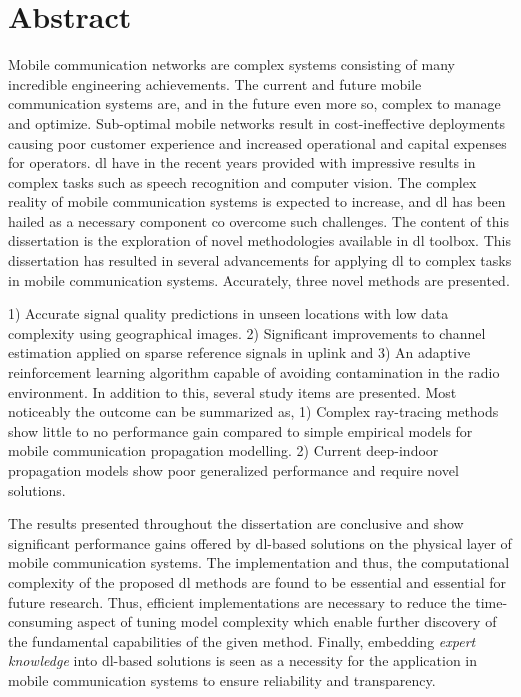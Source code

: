 \chapter*{Abstract}
Mobile communication networks are complex systems consisting of many incredible engineering achievements. The current and future mobile communication systems are, and in the future even more so, complex to manage and optimize. Sub-optimal mobile networks result in cost-ineffective deployments causing poor customer experience and increased operational and capital expenses for operators. \acrfull{dl} have in the recent years provided with impressive results in complex tasks such as speech recognition and computer vision. The complex reality of mobile communication systems is expected to increase, and \acrlong{dl} has been hailed as a necessary component co overcome such challenges. The content of this dissertation is the exploration of novel methodologies available in \acrlong{dl} toolbox. This dissertation has resulted in several advancements for applying \acrlong{dl} to complex tasks in mobile communication systems. Accurately, three novel methods are presented. 

1) Accurate signal quality predictions in unseen locations with low data complexity using geographical images. 2) Significant improvements to channel estimation applied on sparse reference signals in uplink and 3) An adaptive reinforcement learning algorithm capable of avoiding contamination in the radio environment. In addition to this, several study items are presented. Most noticeably the outcome can be summarized as, 1) Complex ray-tracing methods show little to no performance gain compared to simple empirical models for mobile communication propagation modelling. 2) Current deep-indoor propagation models show poor generalized performance and require novel solutions.

The results presented throughout the dissertation are conclusive and show significant performance gains offered by \acrlong{dl}-based solutions on the physical layer of mobile communication systems. The implementation and thus, the computational complexity of the proposed \acrlong{dl} methods are found to be essential and essential for future research. Thus, efficient implementations are necessary to reduce the time-consuming aspect of tuning model complexity which enable further discovery of the fundamental capabilities of the given method. Finally, embedding \emph{expert knowledge} into \acrlong{dl}-based solutions is seen as a necessity for the application in mobile communication systems to ensure reliability and transparency.